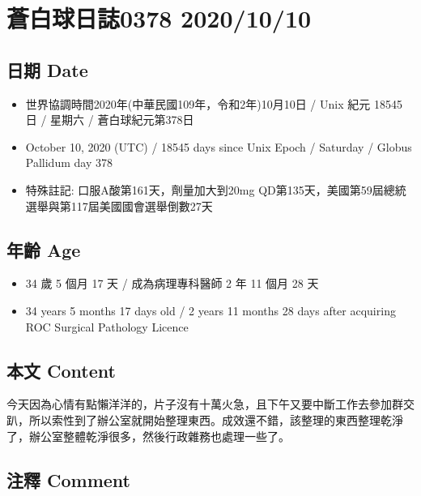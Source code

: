 \documentclass[a5paper, 11pt
]{book}
\providecommand{\tightlist}{%
  \setlength{\itemsep}{0pt}\setlength{\parskip}{0pt}}
\begin{document}
\hypertarget{ux84bcux767dux7403ux65e5ux8a8c0378-20201010}{%
\section{蒼白球日誌0378
2020/10/10}\label{ux84bcux767dux7403ux65e5ux8a8c0378-20201010}}

\hypertarget{ux65e5ux671f-date-37}{%
\subsection{日期 Date}\label{ux65e5ux671f-date-37}}

\begin{itemize}
\tightlist
\item
  世界協調時間2020年(中華民國109年，令和2年)10月10日 / Unix 紀元 18545
  日 / 星期六 / 蒼白球紀元第378日
\item
  October 10, 2020 (UTC) / 18545 days since Unix Epoch / Saturday /
  Globus Pallidum day 378
\item
  特殊註記: 口服A酸第161天，劑量加大到20mg
  QD第135天，美國第59屆總統選舉與第117屆美國國會選舉倒數27天
\end{itemize}

\hypertarget{ux5e74ux9f61-age-37}{%
\subsection{年齡 Age}\label{ux5e74ux9f61-age-37}}

\begin{itemize}
\tightlist
\item
  34 歲 5 個月 17 天 / 成為病理專科醫師 2 年 11 個月 28 天
\item
  34 years 5 months 17 days old / 2 years 11 months 28 days after
  acquiring ROC Surgical Pathology Licence
\end{itemize}

\hypertarget{ux672cux6587-content-37}{%
\subsection{本文 Content}\label{ux672cux6587-content-37}}

今天因為心情有點懶洋洋的，片子沒有十萬火急，且下午又要中斷工作去參加群交趴，所以索性到了辦公室就開始整理東西。成效還不錯，該整理的東西整理乾淨了，辦公室整體乾淨很多，然後行政雜務也處理一些了。

\hypertarget{ux6ce8ux91cb-comment-37}{%
\subsection{注釋 Comment}\label{ux6ce8ux91cb-comment-37}}
\end{document}
